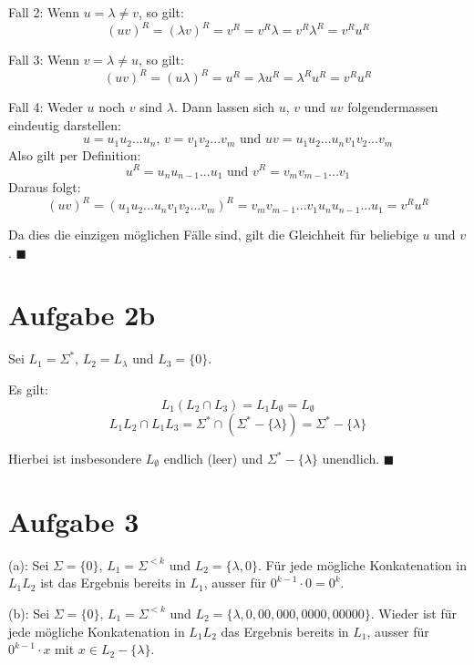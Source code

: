 \documentclass[a4paper]{article}
\begin{document}
	Fall 2: Wenn $u = \lambda \neq v$, so gilt:
	\[(uv)^R = (\lambda v)^R = v^R = v^R \lambda = v^R \lambda^R = v^R u^R\]

	Fall 3: Wenn $v = \lambda \neq u$, so gilt:
	\[(uv)^R = (u \lambda)^R = u^R = \lambda u^R = \lambda^R u^R = v^R u^R\]
	
	Fall 4: Weder $u$ noch $v$ sind $\lambda$.
	Dann lassen sich $u$, $v$ und $uv$ folgendermassen eindeutig darstellen:
	\[u = u_{1}u_{2}...u_{n} \text{, } v = v_{1}v_{2}...v_{m} \text{ und } uv = u_{1}u_{2}...u_{n}v_{1}v_{2}...v_{m} \]
	Also gilt per Definition:
	\[u^R = u_{n}u_{n-1}...u_{1} \text{ und } v^R = v_{m}v_{m-1}...v_{1}\]
	Daraus folgt:
	\[(uv)^R = (u_{1}u_{2}...u_{n}v_{1}v_{2}...v_{m})^R 
	= v_{m}v_{m-1}...v_{1}u_{n}u_{n-1}...u_{1} = v^R u^R\]

	Da dies die einzigen möglichen Fälle sind, gilt die Gleichheit für beliebige $u$ und $v$. $\blacksquare$

\section{Aufgabe 2b}
	Sei $L_{1} = \Sigma^*$, $ L_{2} = L_{\lambda}$ und $ L_{3} = \big\{ 0 \big\}$.

	Es gilt:
	\[L_{1}(L_{2} \cap L_{3}) = L_{1}L_{\emptyset} = L_{\emptyset}\]
	\[L_{1}L_{2} \cap L_{1}L_{3} = \Sigma^* \cap (\Sigma^* - \big\{ \lambda \big\}) = \Sigma^* - \big\{ \lambda \big\}\]

	Hierbei ist insbesondere $L_{\emptyset}$ endlich (leer) und $\Sigma^* - \big\{ \lambda \big\}$ unendlich. $\blacksquare$

\section{Aufgabe 3}
	(a): Sei $\Sigma = \big\{ 0 \big\}$, $L_{1} = \Sigma^{< k}$ und $L_{2} = \big\{ \lambda, 0 \big\}$.
	Für jede mögliche Konkatenation in $L_{1}L_{2}$ ist das Ergebnis bereits in $L_{1}$, ausser 
	für $0^{k-1} \cdot 0 = 0^k$.

	(b): Sei $\Sigma = \big\{ 0 \big\}$, $L_{1} = \Sigma^{< k}$ und $L_{2} = \big\{ \lambda, 0, 00, 000, 0000, 00000 \big\}$.
	Wieder ist für jede mögliche Konkatenation in $L_{1}L_{2}$ das Ergebnis bereits in $L_{1}$, ausser
	für $0^{k-1} \cdot x$ mit $x \in L_{2} - \big\{ \lambda \big\}$.
	
\end{document}
